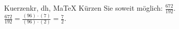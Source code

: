 \begin{MAufgabe}{Kuerzen}{kr, dh, MaTeX}
K\"urzen Sie soweit m\"oglich: $\frac{672}{192}$.\\ 
\ifLsg\MLoesung
\quad $\frac{672}{192}=\frac{(96)\cdot(7)}{(96)\cdot(2)}=\frac{7}{2}$.\else\relax\fi
 \end{MAufgabe}